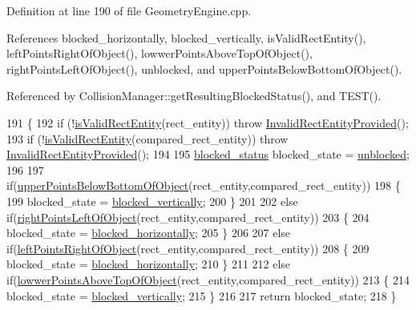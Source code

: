 Definition at line 190 of file Geometry\-Engine.\-cpp.



References blocked\-\_\-horizontally, blocked\-\_\-vertically, is\-Valid\-Rect\-Entity(), left\-Points\-Right\-Of\-Object(), lowwer\-Points\-Above\-Top\-Of\-Object(), right\-Points\-Left\-Of\-Object(), unblocked, and upper\-Points\-Below\-Bottom\-Of\-Object().



Referenced by Collision\-Manager\-::get\-Resulting\-Blocked\-Status(), and T\-E\-S\-T().


\begin{DoxyCode}
191 \{
192     \textcolor{keywordflow}{if} (!\hyperlink{classGeometryEngine_a2ad4dc1a141e3f06b78fe862d9738fbc}{isValidRectEntity}(rect\_entity)) \textcolor{keywordflow}{throw} 
      \hyperlink{classInvalidRectEntityProvided}{InvalidRectEntityProvided}();
193     \textcolor{keywordflow}{if} (!\hyperlink{classGeometryEngine_a2ad4dc1a141e3f06b78fe862d9738fbc}{isValidRectEntity}(compared\_rect\_entity)) \textcolor{keywordflow}{throw} 
      \hyperlink{classInvalidRectEntityProvided}{InvalidRectEntityProvided}();
194 
195     \hyperlink{Structures_8h_a6fef29d9424addfa69bdd2a379424896}{blocked\_status} blocked\_state = \hyperlink{Structures_8h_a6fef29d9424addfa69bdd2a379424896a1596fbf6035468467c790068b609ced3}{unblocked};
196 
197     \textcolor{keywordflow}{if}(\hyperlink{classGeometryEngine_a955c93af2213f83674fb80ebbc76529e}{upperPointsBelowBottomOfObject}(rect\_entity,compared\_rect\_entity))
198     \{
199         blocked\_state =  \hyperlink{Structures_8h_a6fef29d9424addfa69bdd2a379424896a5b5e63da31bc787008b9f40686347e45}{blocked\_vertically};
200     \}
201 
202     \textcolor{keywordflow}{else} \textcolor{keywordflow}{if}(\hyperlink{classGeometryEngine_a88fe436f5cce8f04bf817b52b33e6735}{rightPointsLeftOfObject}(rect\_entity,compared\_rect\_entity))
203     \{
204         blocked\_state = \hyperlink{Structures_8h_a6fef29d9424addfa69bdd2a379424896a582e6420c60bcec29729790197d0459f}{blocked\_horizontally};
205     \}
206 
207     \textcolor{keywordflow}{else} \textcolor{keywordflow}{if}(\hyperlink{classGeometryEngine_a869816b96ce4df08975363692a4a5f7d}{leftPointsRightOfObject}(rect\_entity,compared\_rect\_entity))
208     \{
209         blocked\_state = \hyperlink{Structures_8h_a6fef29d9424addfa69bdd2a379424896a582e6420c60bcec29729790197d0459f}{blocked\_horizontally};
210     \}
211 
212     \textcolor{keywordflow}{else} \textcolor{keywordflow}{if}(\hyperlink{classGeometryEngine_a8fd91015b4dbafc76217bb256632aedd}{lowwerPointsAboveTopOfObject}(rect\_entity,compared\_rect\_entity))
213     \{
214         blocked\_state = \hyperlink{Structures_8h_a6fef29d9424addfa69bdd2a379424896a5b5e63da31bc787008b9f40686347e45}{blocked\_vertically};
215     \}
216 
217     \textcolor{keywordflow}{return} blocked\_state;
218 \}
\end{DoxyCode}
